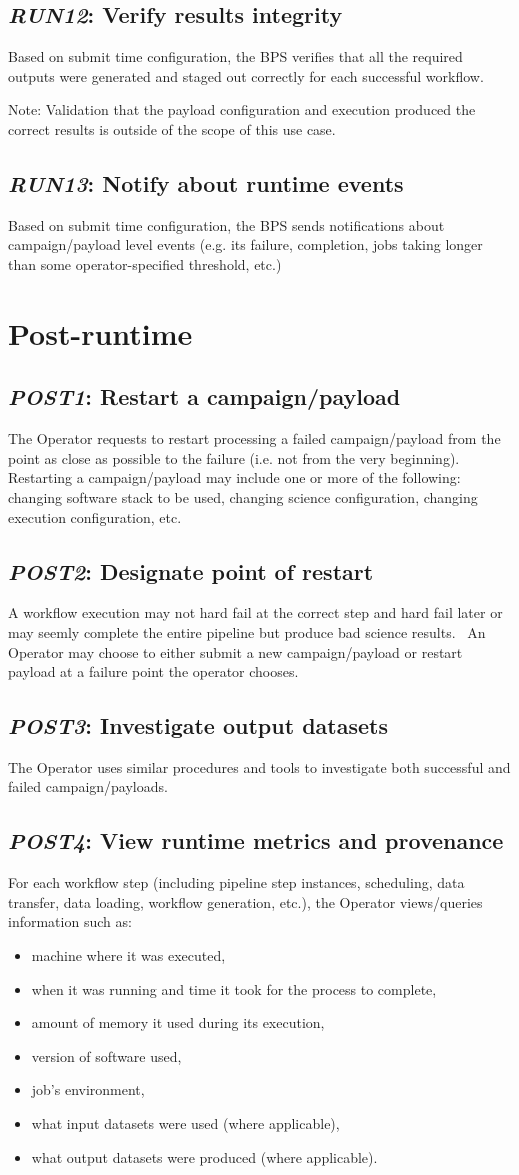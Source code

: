\documentclass[DM,lsstdraft,toc]{lsstdoc}
\newcommand{\usecase}[2]{\subsection{\emph{#1}: #2}\label{use:#1}}
\begin{document}
\usecase{RUN12}{Verify results integrity}
Based on submit time configuration, the BPS verifies that all the required
outputs were generated and staged out correctly for each successful workflow.

Note: Validation that the payload configuration and execution produced the
correct results is outside of the scope of this use case.

\usecase{RUN13}{Notify about runtime events}
Based on submit time configuration, the BPS sends notifications about
campaign/payload level events (e.g.  its failure, completion, jobs taking
longer than some operator-specified threshold, etc.)


\section{Post-runtime}

\usecase{POST1}{Restart a campaign/payload}
The Operator requests to restart processing a failed campaign/payload from the
point as close as possible to the failure (i.e. not from the very beginning).
Restarting a campaign/payload may include one or more of the following:
changing software stack to be used, changing science configuration, changing
execution configuration, etc.

\usecase{POST2}{Designate point of restart}
A workflow execution may not hard fail at the correct step and hard fail later
or may seemly complete the entire pipeline but produce bad science results.  An
Operator may choose to either submit a new campaign/payload or restart payload
at a failure point the operator chooses.

\usecase{POST3}{Investigate output datasets}
The Operator uses similar procedures and tools to investigate both
successful and failed campaign/payloads.

\usecase{POST4}{View runtime metrics and provenance}
For each workflow step (including pipeline step instances, scheduling, data
transfer, data loading, workflow generation, etc.), the Operator views/queries
information such as:

\begin{itemize}
  \item
    machine where it was executed,
  \item
    when it was running and time it took for the process to complete,
  \item
    amount of memory it used during its execution,
  \item
    version of software used,
  \item
    job's environment,
  \item
    what input datasets were used (where applicable),
  \item
    what output datasets were produced (where applicable).
\end{itemize}
\end{document}
